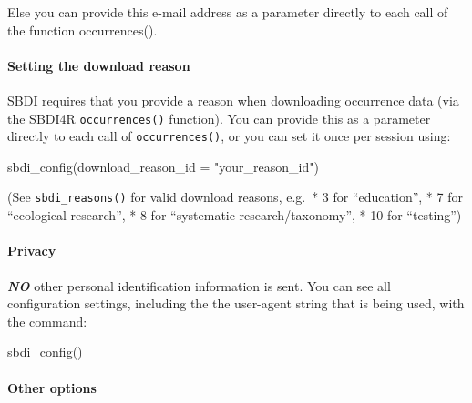 \documentclass[
  10pt,
]{article}
\newenvironment{Shaded}{\begin{snugshade}}{\end{snugshade}}
\newcommand{\AttributeTok}[1]{\textcolor[rgb]{0.77,0.63,0.00}{#1}}
\newcommand{\FunctionTok}[1]{\textcolor[rgb]{0.00,0.00,0.00}{#1}}
\newcommand{\NormalTok}[1]{#1}
\newcommand{\StringTok}[1]{\textcolor[rgb]{0.31,0.60,0.02}{#1}}
\begin{document}
Else you can provide this e-mail address as a parameter directly to each call of the function occurrences().

\hypertarget{setting-the-download-reason}{%
\paragraph*{Setting the download reason}\label{setting-the-download-reason}}

SBDI requires that you provide a reason when downloading occurrence data (via the SBDI4R \texttt{occurrences()} function). You can provide this as a parameter directly to each call of \texttt{occurrences()}, or you can set it once per session using:

\begin{Shaded}
\begin{Highlighting}[]
\FunctionTok{sbdi\_config}\NormalTok{(}\AttributeTok{download\_reason\_id =} \StringTok{"your\_reason\_id"}\NormalTok{)}
\end{Highlighting}
\end{Shaded}

(See \texttt{sbdi\_reasons()} for valid download reasons, e.g.~* 3 for ``education'', * 7 for ``ecological research'', * 8 for ``systematic research/taxonomy'', * 10 for ``testing'')

\hypertarget{privacy}{%
\paragraph*{Privacy}\label{privacy}}

\textbf{\emph{NO}} other personal identification information is sent. You can see all configuration settings, including the the user-agent string that is being used, with the command:

\begin{Shaded}
\begin{Highlighting}[]
\FunctionTok{sbdi\_config}\NormalTok{()}
\end{Highlighting}
\end{Shaded}

\hypertarget{other-options}{%
\paragraph*{Other options}\label{other-options}}
\end{document}
